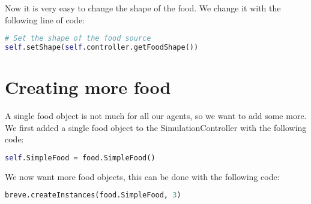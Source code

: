 Now it is very easy to change the shape of the food. We change it with the following line of code:
\begin{lstlisting}[language=Python]
# Set the shape of the food source
self.setShape(self.controller.getFoodShape())
\end{lstlisting}

\section{Creating more food}
A single food object is not much for all our agents, so we want to add some more. We first added a single food object to the SimulationController with the following code:
\begin{lstlisting}[language=Python]
self.SimpleFood = food.SimpleFood()
\end{lstlisting}
We now want more food objects, this can be done with the following code:
\begin{lstlisting}[language=Python]
breve.createInstances(food.SimpleFood, 3)
\end{lstlisting}
